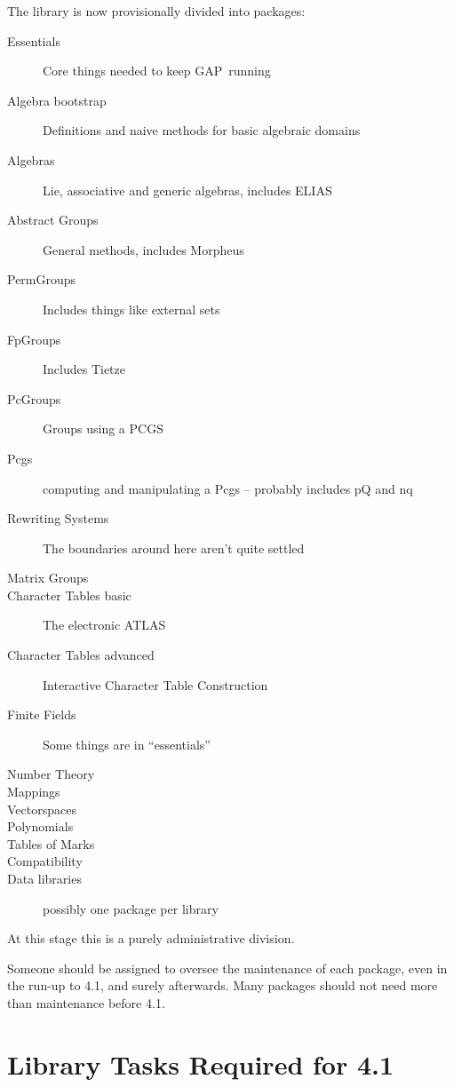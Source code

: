 \documentclass[12pt]{article}
\newcommand{\GAP}{\textsf{GAP}}
\newcommand{\bd}{\begin{description}}
\newcommand{\ed}{\end{description}}
\begin{document}
The library is now provisionally divided into packages:
\bd
\item[Essentials] Core things needed to keep \GAP\ running
\item[Algebra bootstrap] Definitions and naive methods for basic
algebraic domains
\item[Algebras] Lie, associative and generic algebras, includes ELIAS
\item[Abstract Groups] General methods, includes Morpheus
\item[PermGroups] Includes things like external sets
\item[FpGroups] Includes Tietze
\item[PcGroups] Groups using a PCGS
\item[Pcgs] computing and manipulating a Pcgs -- probably includes pQ
and nq
\item[Rewriting Systems] The boundaries around here aren't quite
settled
\item[Matrix Groups] 
\item[Character Tables basic] The electronic ATLAS
\item[Character Tables advanced] Interactive Character Table
Construction
\item[Finite Fields] Some things are in ``essentials''
\item[Number Theory] 
\item[Mappings]
\item[Vectorspaces]
\item[Polynomials]
\item[Tables of Marks]
\item[Compatibility]
\item[Data libraries] possibly one package per library
\ed

At this stage this is a purely administrative division. 

Someone should be assigned to oversee the maintenance of each package,
even in the run-up to 4.1, and surely afterwards. Many packages should
not need more than maintenance before 4.1.

\section{Library Tasks Required for 4.1}
\end{document}

